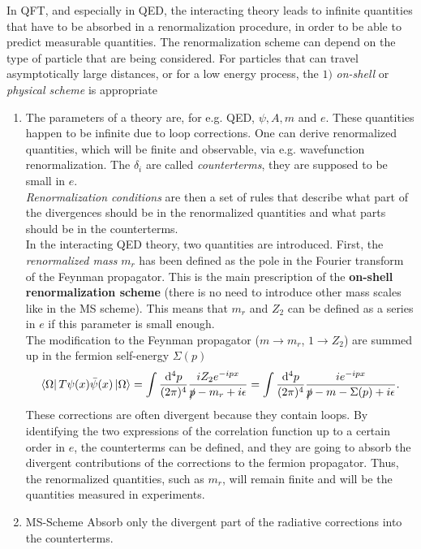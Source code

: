In QFT, and especially in QED, the interacting theory leads to infinite quantities that have to be absorbed in a renormalization procedure, in order to be able to predict measurable quantities. The renormalization scheme can depend on the type of particle that are being considered. For particles that can travel asymptotically large distances, or for a low energy process, the $1)$ \emph{on-shell} or \emph{physical scheme} is appropriate
\begin{enumerate}
	\item The parameters of a theory are, for e.g. QED, $\psi, A, m$ and $e$. These quantities happen to be infinite due to loop corrections. One can derive renormalized quantities, which will be finite and observable, via e.g. wavefunction renormalization. The $\delta_i$ are called \emph{counterterms}, they are supposed to be small in $e$.\\
	\emph{Renormalization conditions} are then a set of rules that describe what part of the divergences should be in the renormalized quantities and what parts should be in the counterterms.\\
	In the interacting QED theory, two quantities are introduced. First, the \emph{renormalized mass} $m_r$ has been defined as the pole in the Fourier transform of the Feynman propagator. This is the main prescription of the \textbf{on-shell renormalization scheme} (there is no need to introduce other mass scales like in the MS scheme). This means that $m_r$ and $Z_2$ can be defined as a series in $e$ if this parameter is small enough.\\
	The modification to the Feynman propagator ($m\rightarrow m_r$, $1\rightarrow Z_2$) are summed up in the fermion self-energy $\Sigma(p)$
	\begin{equation}
		\bra{\Omega}T\psi(x) \bar{\psi}(x)\ket{\Omega} = \int \frac{\mathrm{d}^4 p}{(2 \pi)^4} \frac{iZ_2 e^{-ipx}}{\slashed{p} -m_r+i\epsilon} = \int \frac{\mathrm{d}^4 p}{(2 \pi)^4} \frac{i e^{-i p x}}{\slashed{p} - m-\Sigma(p) +i\epsilon}.
	\end{equation}
	These corrections are often divergent because they contain loops. By identifying the two expressions of the correlation function up to a certain order in $e$, the counterterms can be defined, and they are going to absorb the divergent contributions of the corrections to the fermion propagator. Thus, the renormalized quantities, such as $m_r$, will remain finite and will be the quantities measured in experiments.
	\item \begin{mybox}{MS-Scheme}
	Absorb only the divergent part of the radiative corrections into the counterterms.
	\end{mybox}
\end{enumerate}

















